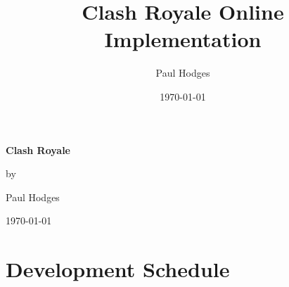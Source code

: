 \documentclass{article}
\title{Clash Royale Online Implementation}
\author{Paul Hodges}
\date{\today}
\begin{document}
\begin{titlepage}
    \centering
    \vspace*{4cm}
    {\Huge \textbf{Clash Royale} \par}
    \vspace{2cm}
    {\Large by \par}
    \vspace{1cm}
    {\Large Paul Hodges \par}
    \vspace{3cm}
    {\Large \today \par}
    \vspace*{4cm}
\end{titlepage}

\tableofcontents
\newpage

\section{Development Schedule}
\end{document}
